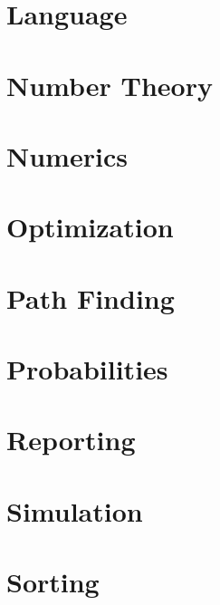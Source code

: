 \documentclass[10pt,a4paper]{report}
\begin{document}
\chapter{Language}
 

\chapter{Number Theory}

\chapter{Numerics}

\chapter{Optimization}

\chapter{Path Finding}

\chapter{Probabilities}

\chapter{Reporting}

\chapter{Simulation}

\chapter{Sorting}
\end{document}
